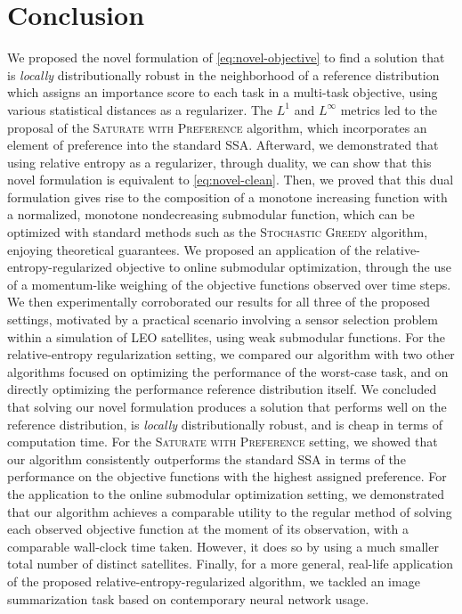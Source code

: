 \documentclass[letter,11pt]{article}
\begin{document}
\section{Conclusion}
We proposed the novel formulation of \eqref{eq:novel-objective} to find a solution that is \textit{locally} distributionally robust in the neighborhood of a reference distribution which assigns an importance score to each task in a multi-task objective, using various statistical distances as a regularizer. The $L^1$ and $L^\infty$ metrics led to the proposal of the \textsc{Saturate with Preference} algorithm, which incorporates an element of preference into the standard SSA. Afterward, we demonstrated that using relative entropy as a regularizer, through duality, we can show that this novel formulation is equivalent to \eqref{eq:novel-clean}. Then, we proved that this dual formulation gives rise to the composition of a monotone increasing function with a normalized, monotone nondecreasing submodular function, which can be optimized with standard methods such as the \textsc{Stochastic Greedy} algorithm, enjoying theoretical guarantees. We proposed an application of the relative-entropy-regularized objective to online submodular optimization, through the use of a momentum-like weighing of the objective functions observed over time steps. We then experimentally corroborated our results for all three of the proposed settings, motivated by a practical scenario involving a sensor selection problem within a simulation of LEO satellites, using weak submodular functions. For the relative-entropy regularization setting, we compared our algorithm with two other algorithms focused on optimizing the performance of the worst-case task, and on directly optimizing the performance reference distribution itself. We concluded that solving our novel formulation produces a solution that performs well on the reference distribution, is \textit{locally} distributionally robust, and is cheap in terms of computation time. For the \textsc{Saturate with Preference} setting, we showed that our algorithm consistently outperforms the standard SSA in terms of the performance on the objective functions with the highest assigned preference. For the application to the online submodular optimization setting, we demonstrated that our algorithm achieves a comparable utility to the regular method of solving each observed objective function at the moment of its observation, with a comparable wall-clock time taken. However, it does so by using a much smaller total number of distinct satellites. Finally, for a more general, real-life application of the proposed relative-entropy-regularized algorithm, we tackled an image summarization task based on contemporary neural network usage.
\newpage
\end{document}
